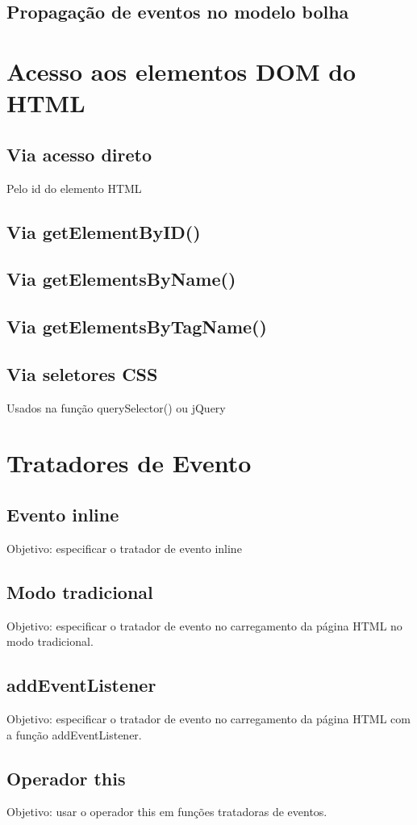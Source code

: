 \subsection{Propagação de eventos no modelo bolha}

\section{Acesso aos elementos DOM do HTML }
\subsection{Via acesso direto}
 Pelo id do elemento HTML
\subsection{Via getElementByID()}
\subsection{Via getElementsByName()}
\subsection{Via getElementsByTagName()}
\subsection{Via seletores CSS}
  Usados na função querySelector() ou jQuery
  
\section{Tratadores de Evento}
\subsection{Evento inline}
Objetivo: especificar o tratador de evento inline
\subsection{Modo tradicional}
Objetivo: especificar o tratador de evento no carregamento da página HTML no modo tradicional.
\subsection{addEventListener}
 Objetivo: especificar o tratador de evento no carregamento da página HTML com a função addEventListener.
 
\subsection{Operador this}
 Objetivo: usar o operador this em funções tratadoras de eventos.
